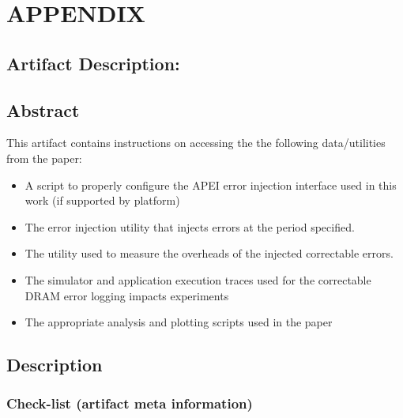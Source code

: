 \clearpage
\appendix
\section{APPENDIX}
\label{sec:appendix}

\subsection{Artifact Description: \myTitle}


\subsection{Abstract}

This artifact contains instructions on accessing the the following
data/utilities from the paper:
\begin{itemize}
        \item A script to properly configure the APEI error injection interface
                used in this work (if supported by platform)
        \item The error injection utility that injects errors at the period
                specified.
        \item The \selfish utility used to measure the overheads of the injected
                correctable errors.
        \item The \LogGOPSim simulator and application execution traces used for
                the correctable DRAM error logging impacts  experiments 
        \item The appropriate analysis and plotting scripts used in the paper
\end{itemize}

\subsection{Description}

\subsubsection{Check-list (artifact meta information)}


